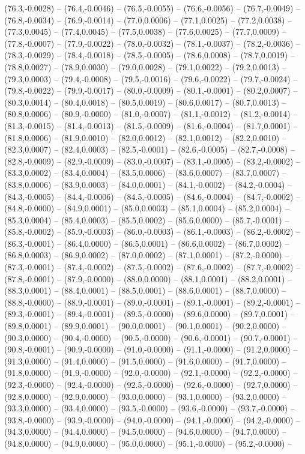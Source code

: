 \documentclass{SVnote}
\begin{document}
(76.3,-0.0028) -- (76.4,-0.0046) -- (76.5,-0.0055) -- (76.6,-0.0056) -- (76.7,-0.0049) -- (76.8,-0.0034) -- (76.9,-0.0014) -- (77.0,0.0006) -- (77.1,0.0025) -- (77.2,0.0038) -- (77.3,0.0045) -- (77.4,0.0045) -- (77.5,0.0038) -- (77.6,0.0025) -- (77.7,0.0009) -- (77.8,-0.0007) -- (77.9,-0.0022) -- (78.0,-0.0032) -- (78.1,-0.0037) -- (78.2,-0.0036) -- (78.3,-0.0029) -- (78.4,-0.0018) -- (78.5,-0.0005) -- (78.6,0.0008) -- (78.7,0.0019) -- (78.8,0.0027) -- (78.9,0.0030) -- (79.0,0.0028) -- (79.1,0.0022) -- (79.2,0.0013) -- (79.3,0.0003) -- (79.4,-0.0008) -- (79.5,-0.0016) -- (79.6,-0.0022) -- (79.7,-0.0024) -- (79.8,-0.0022) -- (79.9,-0.0017) -- (80.0,-0.0009) -- (80.1,-0.0001) -- (80.2,0.0007) -- (80.3,0.0014) -- (80.4,0.0018) -- (80.5,0.0019) -- (80.6,0.0017) -- (80.7,0.0013) -- (80.8,0.0006) -- (80.9,-0.0000) -- (81.0,-0.0007) -- (81.1,-0.0012) -- (81.2,-0.0014) -- (81.3,-0.0015) -- (81.4,-0.0013) -- (81.5,-0.0009) -- (81.6,-0.0004) -- (81.7,0.0001) -- (81.8,0.0006) -- (81.9,0.0010) -- (82.0,0.0012) -- (82.1,0.0012) -- (82.2,0.0010) -- (82.3,0.0007) -- (82.4,0.0003) -- (82.5,-0.0001) -- (82.6,-0.0005) -- (82.7,-0.0008) -- (82.8,-0.0009) -- (82.9,-0.0009) -- (83.0,-0.0007) -- (83.1,-0.0005) -- (83.2,-0.0002) -- (83.3,0.0002) -- (83.4,0.0004) -- (83.5,0.0006) -- (83.6,0.0007) -- (83.7,0.0007) -- (83.8,0.0006) -- (83.9,0.0003) -- (84.0,0.0001) -- (84.1,-0.0002) -- (84.2,-0.0004) -- (84.3,-0.0005) -- (84.4,-0.0006) -- (84.5,-0.0005) -- (84.6,-0.0004) -- (84.7,-0.0002) -- (84.8,-0.0000) -- (84.9,0.0001) -- (85.0,0.0003) -- (85.1,0.0004) -- (85.2,0.0004) -- (85.3,0.0004) -- (85.4,0.0003) -- (85.5,0.0002) -- (85.6,0.0000) -- (85.7,-0.0001) -- (85.8,-0.0002) -- (85.9,-0.0003) -- (86.0,-0.0003) -- (86.1,-0.0003) -- (86.2,-0.0002) -- (86.3,-0.0001) -- (86.4,0.0000) -- (86.5,0.0001) -- (86.6,0.0002) -- (86.7,0.0002) -- (86.8,0.0003) -- (86.9,0.0002) -- (87.0,0.0002) -- (87.1,0.0001) -- (87.2,-0.0000) -- (87.3,-0.0001) -- (87.4,-0.0002) -- (87.5,-0.0002) -- (87.6,-0.0002) -- (87.7,-0.0002) -- (87.8,-0.0001) -- (87.9,-0.0000) -- (88.0,0.0000) -- (88.1,0.0001) -- (88.2,0.0001) -- (88.3,0.0001) -- (88.4,0.0001) -- (88.5,0.0001) -- (88.6,0.0001) -- (88.7,0.0000) -- (88.8,-0.0000) -- (88.9,-0.0001) -- (89.0,-0.0001) -- (89.1,-0.0001) -- (89.2,-0.0001) -- (89.3,-0.0001) -- (89.4,-0.0001) -- (89.5,-0.0000) -- (89.6,0.0000) -- (89.7,0.0001) -- (89.8,0.0001) -- (89.9,0.0001) -- (90.0,0.0001) -- (90.1,0.0001) -- (90.2,0.0000) -- (90.3,0.0000) -- (90.4,-0.0000) -- (90.5,-0.0000) -- (90.6,-0.0001) -- (90.7,-0.0001) -- (90.8,-0.0001) -- (90.9,-0.0000) -- (91.0,-0.0000) -- (91.1,-0.0000) -- (91.2,0.0000) -- (91.3,0.0000) -- (91.4,0.0000) -- (91.5,0.0000) -- (91.6,0.0000) -- (91.7,0.0000) -- (91.8,0.0000) -- (91.9,-0.0000) -- (92.0,-0.0000) -- (92.1,-0.0000) -- (92.2,-0.0000) -- (92.3,-0.0000) -- (92.4,-0.0000) -- (92.5,-0.0000) -- (92.6,-0.0000) -- (92.7,0.0000) -- (92.8,0.0000) -- (92.9,0.0000) -- (93.0,0.0000) -- (93.1,0.0000) -- (93.2,0.0000) -- (93.3,0.0000) -- (93.4,0.0000) -- (93.5,-0.0000) -- (93.6,-0.0000) -- (93.7,-0.0000) -- (93.8,-0.0000) -- (93.9,-0.0000) -- (94.0,-0.0000) -- (94.1,-0.0000) -- (94.2,-0.0000) -- (94.3,0.0000) -- (94.4,0.0000) -- (94.5,0.0000) -- (94.6,0.0000) -- (94.7,0.0000) -- (94.8,0.0000) -- (94.9,0.0000) -- (95.0,0.0000) -- (95.1,-0.0000) -- (95.2,-0.0000) -- 
\end{document}
